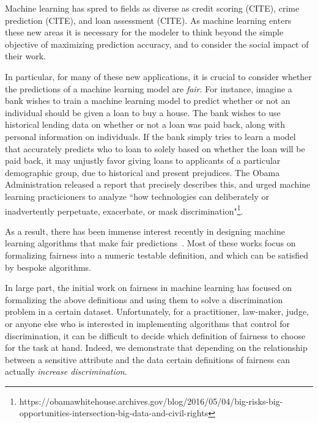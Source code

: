 Machine learning has spred to fields as diverse as credit scoring
(CITE), crime prediction (CITE), and loan assessment (CITE). As
machine learning enters these new areas it is necessary for the
modeler to think beyond the simple objective of maximizing prediction
accuracy, and to consider the social impact of their work.

In particular, for many of these new applications, it is crucial to
consider whether the predictions of a machine learning model are
\emph{fair}. For instance, imagine a bank wishes to train a machine
learning model to predict whether or not an individual should be given
a loan to buy a house. The bank wishes to use historical lending data
on whether or not a loan was paid back, along with personal
information on individuals. If the bank simply tries to learn a model
that accurately predicts who to loan to solely based on whether the
loan will be paid back, it may unjustly favor giving loans to
applicants of a particular demographic group, due to historical and
present prejudices. The Obama Administration released a report that
precisely describes this, and urged machine learning practicioners to
analyze ``how technologies can deliberately or inadvertently
perpetuate, exacerbate, or mask
discrimination"\footnote{https://obamawhitehouse.archives.gov/blog/2016/05/04/big-risks-big-opportunities-intersection-big-data-and-civil-rights}.

As a result, there has been immense interest recently in designing
machine learning algorithms that make fair
predictions~\cite{hardt2016equality,dwork2012fairness,joseph2016rawlsian,kamishima2011fairness,zliobaite2015survey,zafar2016fairness,zafar2015learning,grgiccase,kleinberg2016inherent,calders2010three,kamiran2012data,bolukbasi2016man,kamiran2009classifying,zemel2013learning,louizos2015variational}. Most
of these works focus on formalizing fairness into a numeric testable
definition, and which can be satisfied by bespoke algorithms.

In large part, the initial work on fairness in machine learning has
focused on formalizing the above definitions and using them to solve a
discrimination problem in a certain dataset. Unfortunately, for a
practitioner, law-maker, judge, or anyone else who is interested in
implementing algorithms that control for discrimination, it can be
difficult to decide which definition of fairness to choose for the
task at hand. Indeed, we demonstrate that depending on the
relationship between a sensitive attribute and the data certain
definitions of fairness can actually \emph{increase discrimination}.

